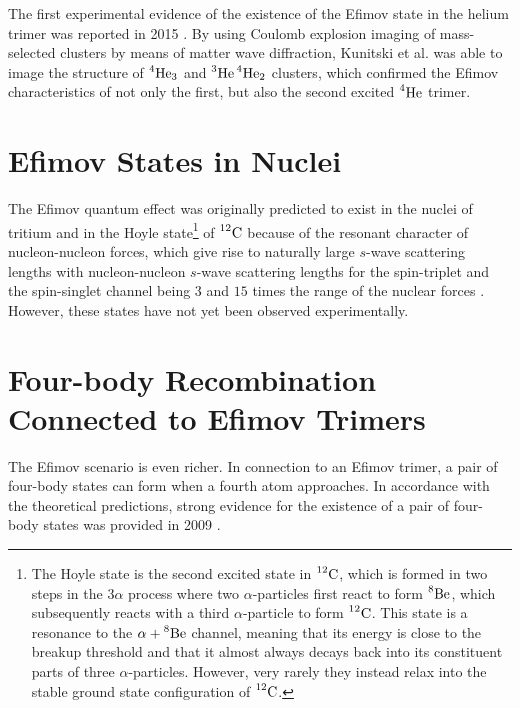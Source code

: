 The first experimental evidence of the existence of the Efimov state in the helium trimer was reported in 2015 \cite{Blume2015}. By using Coulomb explosion imaging of mass-selected clusters by means of matter wave diffraction, Kunitski et al. was able to image the structure of $\prescript{4}{}{\mathrm{He}}_3$ and $\prescript{3}{}{\mathrm{He}}\prescript{4}{}{\mathrm{He}}_2$ clusters, which confirmed the Efimov characteristics of not only the first, but also the second excited $\prescript{4}{}{\mathrm{He}}$ trimer. 

\section{Efimov States in Nuclei }
The Efimov quantum effect was originally predicted to exist in the nuclei of tritium and in the Hoyle state\footnote{The Hoyle state is the second excited state in $\prescript{12}{}{\mathrm{C}}$, which is formed in two steps in the $3\alpha$ process where two $\alpha$-particles first react to form $\prescript{8}{}{\mathrm{Be}}$, which subsequently reacts with a third $\alpha$-particle to form $\prescript{12}{}{\mathrm{C}}$. This state is a resonance to the $\alpha + \prescript{8}{}{\mathrm{Be}}$ channel, meaning that its energy is close to the breakup threshold and that it almost always decays back into its constituent parts of three $\alpha$-particles. However, very rarely they instead relax into the stable ground state configuration of $\prescript{12}{}{\mathrm{C}}$.} of $\prescript{12}{}{\mathrm{C}}$ because of the resonant character of nucleon-nucleon forces, which give rise to naturally large $s$-wave scattering lengths with nucleon-nucleon $s$-wave scattering lengths for the spin-triplet and the spin-singlet channel being $3$ and $15$ times the range of the nuclear forces \cite{Efimov:1970zz,Efimov:1971zz}.  However, these states have not yet been observed experimentally. 

\section{Four-body Recombination Connected to Efimov Trimers} 
The Efimov scenario is even richer. In connection to an Efimov trimer, a pair of four-body states can form when a fourth atom approaches. In accordance with the theoretical predictions, strong evidence for the existence of a pair of four-body states was provided in 2009 \cite{Grimm:2009}.